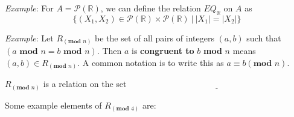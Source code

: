 
{\it Example}: For $A = \mathcal{P}(\mathbb{R})$, we can define the relation $EQ_{\mathbb{R}}$ on $A$ as 
\[
\{ (X_1, X_2 ) \in\mathcal{P}(\mathbb{R})  \times \mathcal{P}(\mathbb{R}) ~|~ |X_1| = |X_2| \}
\]

\vspace{50pt}

{\it Example}: Let $R_{(\textbf{mod } n)}$ be the set of all pairs of integers $(a, b)$ such that $(a \textbf{ mod } n = b \textbf{ mod } n)$.
Then $a$ is {\bf congruent to} $b$ \textbf{mod} $n$ means $(a, b) \in R_{(\textbf{mod } n)}$. A common notation is to write this as $a \equiv b (\textbf{mod } n)$.


$R_{(\textbf{mod } n)}$ is a relation on the set $\underline{\phantom{\mathbb{Z}}\hspace{20em}}$


Some example elements of $R_{(\textbf{mod } 4)}$ are: 

\vspace{50pt}